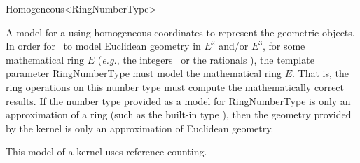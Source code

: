 \begin{ccRefClass}{Homogeneous<RingNumberType>}

\ccDefinition
A model for a  using homogeneous coordinates to represent the
geometric objects.  In order for \ccRefName\ to model Euclidean geometry
in $E^2$ and/or $E^3$, for some mathematical ring $E$ (\textit{e.g.},
the integers \Z\ or the rationals \Q), the template parameter RingNumberType
must model the mathematical ring $E$.  That is, the ring operations on this
number type must compute the mathematically correct results.  If the number
type provided as a model for RingNumberType is only an approximation of a
ring (such as the built-in type ), then the geometry provided by
the kernel is only an approximation of Euclidean geometry.  

\ccIsModel
{}

\ccTypes
{}
\ccGlue
{}

\ccImplementation
This model of a kernel uses reference counting.

\ccSeeAlso
{} \\
 \\
 \\

\end{ccRefClass}
